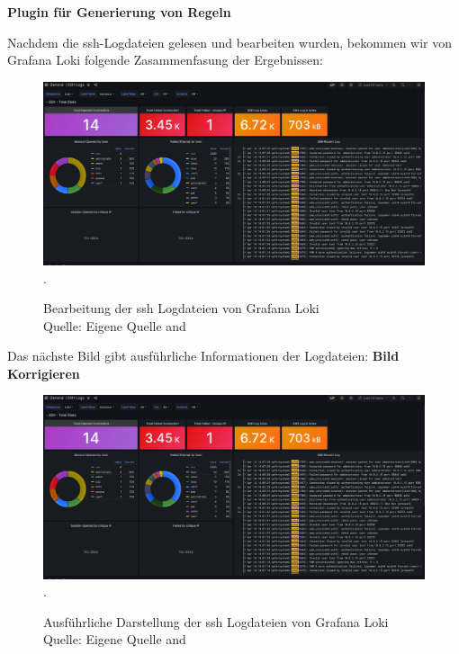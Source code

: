 \textbf{Plugin für Generierung von Regeln}


\newpage
\thispagestyle{lscape}
\begin{landscape}
   Nachdem die \gls{ssh}-Logdateien gelesen und bearbeiten wurden, bekommen wir von Grafana Loki folgende Zasammenfasung der Ergebnissen:
   \begin{center}
      \begin{figure}[H]
         \centering
         \includegraphics[width=1.3\textwidth]{assets/GrafanaLoki_sshDetailed.png}.
         \caption{Bearbeitung der \gls{ssh} Logdateien von Grafana Loki\\Quelle: Eigene Quelle and \citep{VoidQuark_sshlogs}}
         \centering
      \end{figure}
   \end{center}
\end{landscape}

\newpage
\thispagestyle{lscape}
\begin{landscape}
   Das nächste Bild gibt ausführliche Informationen der Logdateien:
   \textbf{Bild Korrigieren}
   \begin{center}
      \begin{figure}[H]
         \centering
         \includegraphics[width=1.3\textwidth]{assets/GrafanaLoki_sshDetailed.png}.
         \caption{Ausführliche Darstellung der \gls{ssh} Logdateien von Grafana Loki\\Quelle: Eigene Quelle and \citep{VoidQuark_sshlogs}}
         \centering
      \end{figure}
   \end{center}
\end{landscape}

